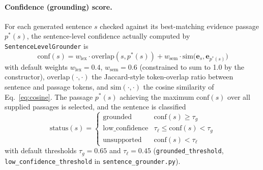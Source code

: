 \documentclass[conference]{IEEEtran}
\begin{document}
\paragraph{Confidence (grounding) score.}
For each generated sentence $s$ checked against its best-matching evidence passage $p^*(s)$, the sentence-level confidence actually computed by \texttt{SentenceLevelGrounder} is
\begin{equation}
\text{conf}(s) = w_{\text{lex}} \cdot \text{overlap}(s, p^*(s)) + w_{\text{sem}} \cdot \text{sim}\big(\mathbf{e}_s, \mathbf{e}_{p^*(s)}\big)
\label{eq:confidence}
\end{equation}
with default weights $w_{\text{lex}} = 0.4$, $w_{\text{sem}} = 0.6$ (constrained to sum to 1.0 by the constructor), $\text{overlap}(\cdot,\cdot)$ the Jaccard-style token-overlap ratio between sentence and passage tokens, and $\text{sim}(\cdot,\cdot)$ the cosine similarity of Eq.~\ref{eq:cosine}. The passage $p^*(s)$ achieving the maximum $\text{conf}(s)$ over all supplied passages is selected, and the sentence is classified
\begin{equation}
\text{status}(s) =
\begin{cases}
\text{grounded} & \text{conf}(s) \geq \tau_g \\
\text{low\_confidence} & \tau_\ell \leq \text{conf}(s) < \tau_g \\
\text{unsupported} & \text{conf}(s) < \tau_\ell
\end{cases}
\label{eq:status}
\end{equation}
with default thresholds $\tau_g = 0.65$ and $\tau_\ell = 0.45$ (\texttt{grounded\_threshold}, \texttt{low\_confidence\_threshold} in \texttt{sentence\_grounder.py}).
\end{document}

